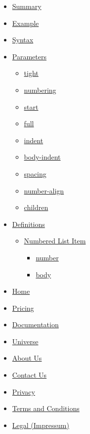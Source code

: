 \begin{itemize}
\tightlist
\item
  \hyperref[summary]{Summary}
\item
  \hyperref[example]{Example}
\item
  \hyperref[syntax]{Syntax}
\item
  \hyperref[parameters]{Parameters}

  \begin{itemize}
  \tightlist
  \item
    \hyperref[parameters-tight]{tight}
  \item
    \hyperref[parameters-numbering]{numbering}
  \item
    \hyperref[parameters-start]{start}
  \item
    \hyperref[parameters-full]{full}
  \item
    \hyperref[parameters-indent]{indent}
  \item
    \hyperref[parameters-body-indent]{body-indent}
  \item
    \hyperref[parameters-spacing]{spacing}
  \item
    \hyperref[parameters-number-align]{number-align}
  \item
    \hyperref[parameters-children]{children}
  \end{itemize}
\item
  \hyperref[definitions]{Definitions}

  \begin{itemize}
  \tightlist
  \item
    \hyperref[definitions-item]{Numbered List Item}

    \begin{itemize}
    \tightlist
    \item
      \hyperref[definitions-item-number]{number}
    \item
      \hyperref[definitions-item-body]{body}
    \end{itemize}
  \end{itemize}
\end{itemize}

\begin{itemize}
\tightlist
\item
  \href{/}{Home}
\item
  \href{/pricing/}{Pricing}
\item
  \href{/docs/}{Documentation}
\item
  \href{/universe/}{Universe}
\item
  \href{/about/}{About Us}
\item
  \href{/contact/}{Contact Us}
\item
  \href{/privacy/}{Privacy}
\item
  \href{https://typst.app/terms}{Terms and Conditions}
\item
  \href{/legal/}{Legal (Impressum)}
\end{itemize}

